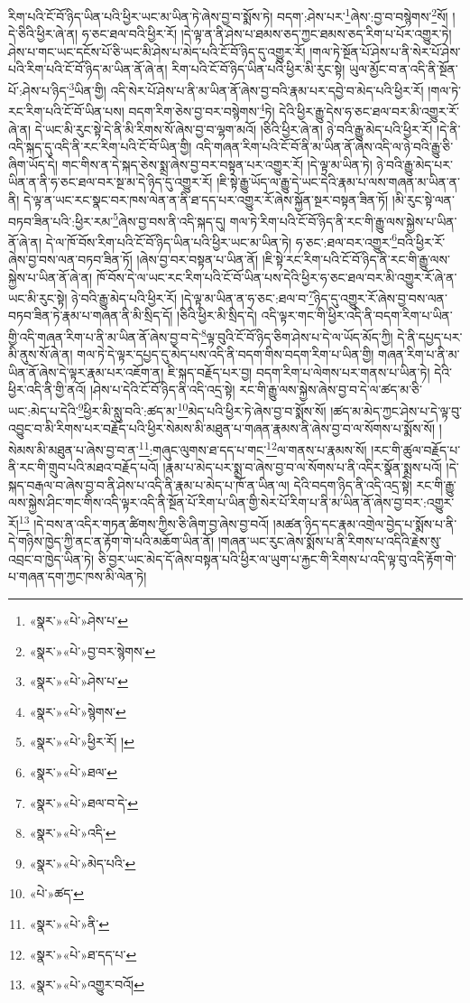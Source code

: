 རིག་པའི་ངོ་བོ་ཉིད་ཡིན་པའི་ཕྱིར་ཡང་མ་ཡིན་ཏེ་ཞེས་བྱ་བ་སྨོས་ཏེ། བདག་:ཤེས་པར་\footnote{«སྣར་»«པེ་»ཤེས་པ་}ཞེས་:བྱ་བ་བསྙེགས་\footnote{«སྣར་»«པེ་»བྱ་བར་སྙེགས་}སོ། །དེ་ཅིའི་ཕྱིར་ཞེ་ན། ཧ་ཅང་ཐལ་བའི་ཕྱིར་རོ། །དེ་ལྟ་ན་ནི་ཤེས་པ་ཐམས་ཅད་ཀྱང་ཐམས་ཅད་རིག་པ་པོར་འགྱུར་ཏེ། ཤེས་པ་གང་ཡང་དངོས་པོ་ཅི་ཡང་མི་ཤེས་པ་མེད་པའི་ངོ་བོ་ཉིད་དུ་འགྱུར་རོ། །གལ་ཏེ་སྔོན་པོ་ཤེས་པ་ནི་སེར་པོ་ཤེས་པའི་རིག་པའི་ངོ་བོ་ཉིད་མ་ཡིན་ནོ་ཞེ་ན། རིག་པའི་ངོ་བོ་ཉིད་ཡིན་པའི་ཕྱིར་མི་རུང་སྟེ། ཡུལ་མྱོང་བ་ན་འདི་ནི་སྔོན་པོ་:ཤེས་པ་ཉིད་\footnote{«སྣར་»«པེ་»ཤེས་པ་}ཡིན་གྱི། འདི་སེར་པོ་ཤེས་པ་ནི་མ་ཡིན་ནོ་ཞེས་བྱ་བའི་རྣམ་པར་དབྱེ་བ་མེད་པའི་ཕྱིར་རོ། །གལ་ཏེ་རང་རིག་པའི་ངོ་བོ་ཡིན་པས། བདག་རིག་ཅེས་བྱ་བར་བསྙེགས་\footnote{«སྣར་»«པེ་»སྙེགས་}ཏེ། དེའི་ཕྱིར་རྒྱུ་དེས་ཧ་ཅང་ཐལ་བར་མི་འགྱུར་རོ་ཞེ་ན། དེ་ཡང་མི་རུང་སྟེ་དེ་ནི་མི་རིགས་སོ་ཞེས་བྱ་བ་ལྷག་མའོ། །ཅིའི་ཕྱིར་ཞེ་ན། ཉེ་བའི་རྒྱུ་མེད་པའི་ཕྱིར་རོ། །དེ་ནི་འདི་སྐད་དུ་འདི་ནི་རང་རིག་པའི་ངོ་བོ་ཡིན་གྱི། འདི་གཞན་རིག་པའི་ངོ་བོ་ནི་མ་ཡིན་ནོ་ཞེས་འདི་ལ་ཉེ་བའི་རྒྱུ་ཅི་ཞིག་ཡོད་དེ། གང་གིས་ན་དེ་སྐད་ཅེས་སྨྲ་ཞེས་བྱ་བར་བསྟན་པར་འགྱུར་རོ། །དེ་ལྟ་མ་ཡིན་ཏེ། ཉེ་བའི་རྒྱུ་མེད་པར་ཡིན་ན་ནི་ཧ་ཅང་ཐལ་བར་སྔ་མ་དེ་ཉིད་དུ་འགྱུར་རོ། །ཇི་སྟེ་རྒྱུ་ཡོད་ལ་རྒྱུ་དེ་ཡང་དེའི་རྣམ་པ་ལས་གཞན་མ་ཡིན་ན་ནི། དེ་ལྟ་ན་ཡང་རང་སྣང་བར་ཁས་ལེན་ན་ནི་ཐ་དད་པར་འགྱུར་རོ་ཞེས་སྐྱོན་སྔར་བསྟན་ཟིན་ཏོ། །མི་རུང་སྟེ་ལན་བཏབ་ཟིན་པའི་:ཕྱིར་རམ་\footnote{«སྣར་»«པེ་»ཕྱིར་རོ། །}ཞེས་བྱ་བས་ནི་འདི་སྐད་དུ། གལ་ཏེ་རིག་པའི་ངོ་བོ་ཉིད་ནི་རང་གི་རྒྱུ་ལས་སྐྱེས་པ་ཡིན་ནོ་ཞེ་ན། དེ་ལ་ཁོ་བོས་རིག་པའི་ངོ་བོ་ཉིད་ཡིན་པའི་ཕྱིར་ཡང་མ་ཡིན་ཏེ། ཧ་ཅང་:ཐལ་བར་འགྱུར་\footnote{«སྣར་»«པེ་»ཐལ་}བའི་ཕྱིར་རོ་ཞེས་བྱ་བས་ལན་བཏབ་ཟིན་ཏོ། །ཞེས་བྱ་བར་བསྟན་པ་ཡིན་ནོ། །ཇི་སྟེ་རང་རིག་པའི་ངོ་བོ་ཉིད་ནི་རང་གི་རྒྱུ་ལས་སྐྱེས་པ་ཡིན་ནོ་ཞེ་ན། ཁོ་བོས་དེ་ལ་ཡང་རང་རིག་པའི་ངོ་བོ་ཡིན་པས་དེའི་ཕྱིར་ཧ་ཅང་ཐལ་བར་མི་འགྱུར་རོ་ཞེ་ན་ཡང་མི་རུང་སྟེ། ཉེ་བའི་རྒྱུ་མེད་པའི་ཕྱིར་རོ། །དེ་ལྟ་མ་ཡིན་ན་ཧ་ཅང་:ཐལ་བ་\footnote{«སྣར་»«པེ་»ཐལ་བ་དེ་}ཉིད་དུ་འགྱུར་རོ་ཞེས་བྱ་བས་ལན་བཏབ་ཟིན་ཏེ་རྣམ་པ་གཞན་ནི་མི་སྲིད་དོ། །ཅིའི་ཕྱིར་མི་སྲིད་དེ། འདི་ལྟར་གང་གི་ཕྱིར་འདི་ནི་བདག་རིག་པ་ཡིན་གྱི་འདི་གཞན་རིག་པ་ནི་མ་ཡིན་ནོ་ཞེས་བྱ་བ་དེ་\footnote{«སྣར་»«པེ་»འདི་}ལྟ་བུའི་ངོ་བོ་ཉིད་ཅིག་ཤེས་པ་དེ་ལ་ཡོད་མོད་ཀྱི། དེ་ནི་དཔྱད་པར་མི་ནུས་སོ་ཞེ་ན། གལ་ཏེ་དེ་ལྟར་དཔྱད་དུ་མེད་པས་འདི་ནི་བདག་གིས་བདག་རིག་པ་ཡིན་གྱི། གཞན་རིག་པ་ནི་མ་ཡིན་ནོ་ཞེས་དེ་ལྟར་རྣམ་པར་འཇོག་ན། ཇི་སྐད་བརྗོད་པར་བྱ། བདག་རིག་པ་ལེགས་པར་གནས་པ་ཡིན་ཏེ། དེའི་ཕྱིར་འདི་ནི་གྱི་ནའོ། །ཤེས་པ་དེའི་ངོ་བོ་ཉིད་ནི་འདི་འདྲ་སྟེ། རང་གི་རྒྱུ་ལས་སྐྱེས་ཞེས་བྱ་བ་དེ་ལ་ཚད་མ་ཅི་ཡང་:མེད་པ་དེའི་\footnote{«སྣར་»«པེ་»མེད་པའི་}ཕྱིར་མི་སླུ་བའི་:ཚད་མ་\footnote{«པེ་»ཚད་}མེད་པའི་ཕྱིར་ཏེ་ཞེས་བྱ་བ་སྨོས་སོ། །ཚད་མ་མེད་ཀྱང་ཤེས་པ་དེ་ལྟ་བུ་འབྱུང་བ་མི་རིགས་པར་བརྗོད་པའི་ཕྱིར་སེམས་མི་མཐུན་པ་གཞན་རྣམས་ནི་ཞེས་བྱ་བ་ལ་སོགས་པ་སྨོས་སོ། །སེམས་མི་མཐུན་པ་ཞེས་བྱ་བ་ན་\footnote{«སྣར་»«པེ་»ནི་}:གཞུང་ལུགས་ཐ་དད་པ་གང་\footnote{«སྣར་»«པེ་»ཐ་དད་པ་}ལ་གནས་པ་རྣམས་སོ། །རང་གི་ཚུལ་བརྗོད་པ་ནི་རང་གི་གྲུབ་པའི་མཐའ་བརྗོད་པའོ། །རྣམ་པ་མེད་པར་སྨྲ་བ་ཞེས་བྱ་བ་ལ་སོགས་པ་ནི་འདིར་སྣོན་སྨྲས་པའོ། །དེ་སྐད་བརྒལ་བ་ཞེས་བྱ་བ་ནི་ཤེས་པ་འདི་ནི་རྣམ་པ་མེད་པ་ཁོ་ན་ཡིན་ལ། དེའི་བདག་ཉིད་ནི་འདི་འདྲ་སྟེ། རང་གི་རྒྱུ་ལས་སྐྱེས་ཤིང་གང་གིས་འདི་ལྟར་འདི་ནི་སྔོན་པོ་རིག་པ་ཡིན་གྱི་སེར་པོ་རིག་པ་ནི་མ་ཡིན་ནོ་ཞེས་བྱ་བར་:འགྱུར་རོ།\footnote{«སྣར་»«པེ་»འགྱུར་བའོ།} །དེ་བས་ན་འདིར་གཏན་ཚིགས་ཀྱིས་ཅི་ཞིག་བྱ་ཞེས་བྱ་བའོ། །མཚན་ཉིད་དང་རྣམ་འགྲེལ་བྱེད་པ་སྨོས་པ་ནི་དེ་གཉིས་ཁྱེད་ཀྱི་ནང་ན་རྟོག་གེ་པའི་མཆོག་ཡིན་ནོ། །གཞན་ཡང་རུང་ཞེས་སྨོས་པ་ནི་རིགས་པ་འདིའི་རྗེས་སུ་འབྲང་བ་ཁྱེད་ཡིན་ཏེ། ཅི་བྱར་ཡང་མེད་དོ་ཞེས་བསྟན་པའི་ཕྱིར་ལ་ཡུག་པ་རྐྱང་གི་རིགས་པ་འདི་ལྟ་བུ་འདི་རྟོག་གེ་པ་གཞན་དག་ཀྱང་ཁས་མི་ལེན་ཏེ། 